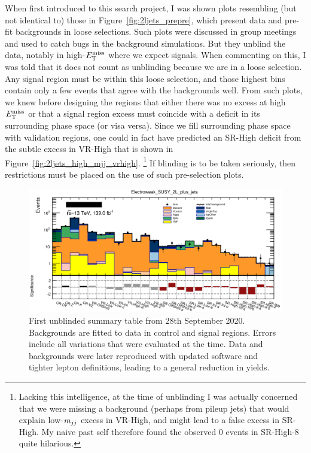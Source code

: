When first introduced to this search project, I was shown plots resembling
(but not identical to) those in Figure~\ref{fig:2ljets_prepre}, which present
data and pre-fit backgrounds in loose selections.
Such plots were discussed in group meetings and used to catch bugs in the
background simulations.
But they unblind the data, notably in high-$E_\mathrm{T}^\mathrm{miss}$ where we expect signals.
When commenting on this, I was told that it does not count as unblinding
because we are in a loose selection.
Any signal region must be within this loose selection, and those
highest bins contain only a few events that agree with the backgrounds well.
From such plots, we knew before designing the regions that either there was no
excess at high $E_\mathrm{T}^\mathrm{miss}$ or that a signal region excess must coincide with a
deficit in its surrounding phase space (or visa versa).
Since we fill surrounding phase space with validation regions, one could in
fact have predicted an SR-High deficit from the subtle excess in VR-High
that is shown in Figure~\ref{fig:2ljets_high_mjj_vrhigh}.%
\footnote{%
Lacking this intelligence, at the time of unblinding I was actually concerned
that we were missing a background (perhaps from pileup jets) that would
explain low-$m_{jj}$ excess in VR-High, and might lead to a false excess
in SR-High.
My naive past self therefore found the observed $0$ events in SR-High-8
quite hilarious.
}
If blinding is to be taken seriously, then restrictions must be placed on the
use of such pre-selection plots.

\begin{figure}[tp]
\centering
\includegraphics[width=\textwidth]{figures/2ljets_summary_unblinding_log.png}
\caption[
First unblinded summary table from 28th September 2020
]{%
First unblinded summary table from 28th September 2020.
Backgrounds are fitted to data in control and signal regions.
Errors include all variations that were evaluated at the time.
Data and backgrounds were later reproduced with updated software and tighter
lepton definitions, leading to a general reduction in yields.
}
\label{fig:2ljets_summary_unblinding}
\end{figure}

